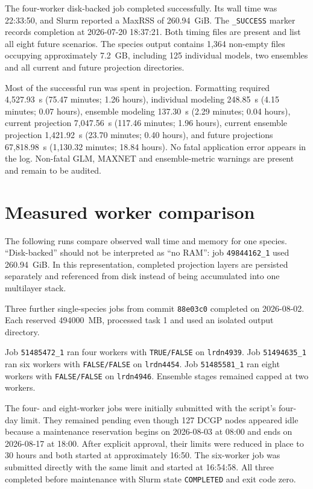 The four-worker disk-backed job completed successfully. Its wall time was 22:33:50, and Slurm reported a MaxRSS of 260.94~GiB. The \texttt{\_SUCCESS} marker records completion at 2026-07-20 18:37:21. Both timing files are present and list all eight future scenarios. The species output contains 1,364 non-empty files occupying approximately 7.2~GB, including 125 individual models, two ensembles and all current and future projection directories.

Most of the successful run was spent in projection. Formatting required 4,527.93~s (75.47 minutes; 1.26 hours), individual modeling 248.85~s (4.15 minutes; 0.07 hours), ensemble modeling 137.30~s (2.29 minutes; 0.04 hours), current projection 7,047.56~s (117.46 minutes; 1.96 hours), current ensemble projection 1,421.92~s (23.70 minutes; 0.40 hours), and future projections 67,818.98~s (1,130.32 minutes; 18.84 hours). No fatal application error appears in the log. Non-fatal GLM, MAXNET and ensemble-metric warnings are present and remain to be audited.

\section{Measured worker comparison}

The following runs compare observed wall time and memory for one species. ``Disk-backed'' should not be interpreted as ``no RAM'': job \texttt{49844162\_1} used 260.94~GiB. In this representation, completed projection layers are persisted separately and referenced from disk instead of being accumulated into one multilayer stack.

Three further single-species jobs from commit \texttt{88e03c0} completed on 2026-08-02. Each reserved 494000~MB, processed task 1 and used an isolated output directory.

Job \texttt{51485472\_1} ran four workers with \texttt{TRUE/FALSE} on \texttt{lrdn4939}. Job \texttt{51494635\_1} ran six workers with \texttt{FALSE/FALSE} on \texttt{lrdn4454}. Job \texttt{51485581\_1} ran eight workers with \texttt{FALSE/FALSE} on \texttt{lrdn4946}. Ensemble stages remained capped at two workers.

The four- and eight-worker jobs were initially submitted with the script's four-day limit. They remained pending even though 127 DCGP nodes appeared idle because a maintenance reservation begins on 2026-08-03 at 08:00 and ends on 2026-08-17 at 18:00. After explicit approval, their limits were reduced in place to 30 hours and both started at approximately 16:50. The six-worker job was submitted directly with the same limit and started at 16:54:58. All three completed before maintenance with Slurm state \texttt{COMPLETED} and exit code zero.

